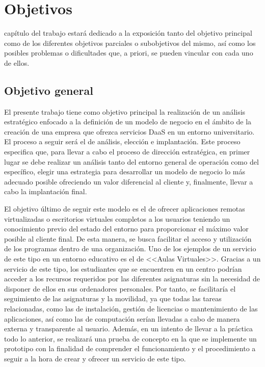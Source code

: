 \chapter{Objetivos}
\label{chap:objetivos}

\noindent
{} capítulo del trabajo estará dedicado a la exposición tanto del objetivo principal como de los diferentes objetivos parciales o subobjetivos del mismo, así como los posibles problemas o dificultades que, a priori, se pueden vincular con cada uno de ellos.

\section{Objetivo general}
El presente trabajo tiene como objetivo principal la realización de un análisis estratégico enfocado a la definición de un modelo de negocio en el ámbito de la creación de una empresa que ofrezca servicios \acs{DaaS} en un entorno universitario. El proceso a seguir será el de análisis, elección e implantación. Este proceso especifica que, para llevar a cabo el proceso de dirección estratégica, en primer lugar se debe realizar un análisis tanto del entorno general de operación como del específico, elegir una estrategia para desarrollar un modelo de negocio lo más adecuado posible ofreciendo un valor diferencial al cliente y, finalmente, llevar a cabo la implantación final.

El objetivo último de seguir este modelo es el de ofrecer aplicaciones remotas virtualizadas o escritorios virtuales completos a los usuarios teniendo un conocimiento previo del estado del entorno para proporcionar el máximo valor posible al cliente final. De esta manera, se busca facilitar el acceso y utilización de los programas dentro de una organización. Uno de los ejemplos de un servicio de este tipo en un entorno educativo es el de <<Aulas Virtuales>>. Gracias a un servicio de este tipo, los estudiantes que se encuentren en un centro podrían acceder a los recursos requeridos por las diferentes asignaturas sin la necesidad de disponer de ellos en sus ordenadores personales. Por tanto, se facilitaría el seguimiento de las asignaturas y la movilidad, ya que todas las tareas relacionadas, como las de instalación, gestión de licencias o mantenimiento de las aplicaciones, así como las de computación serían llevadas a cabo de manera externa y transparente al usuario. Además, en un intento de llevar a la práctica todo lo anterior, se realizará una prueba de concepto en la que se implemente un prototipo con la finalidad de comprender el funcionamiento y el procedimiento a seguir a la hora de crear y ofrecer un servicio de este tipo.


